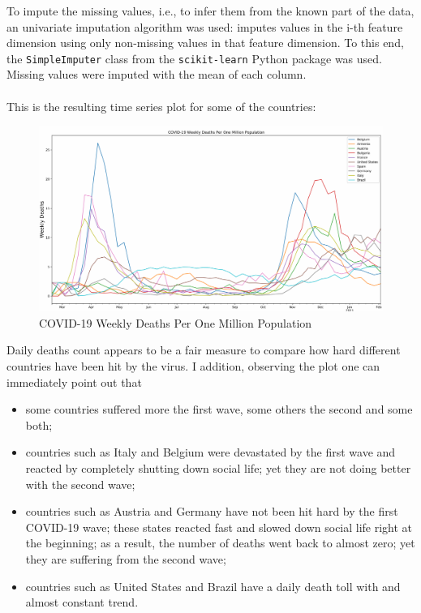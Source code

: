 \documentclass[11pt,a4paper]{article}
\begin{document}
To impute the missing values, i.e., to infer them from the known part of the
data, an univariate imputation algorithm was used: imputes values in the
i-th feature dimension using only non-missing values in that feature dimension.
To this end, the \texttt{SimpleImputer} class from the \texttt{scikit-learn}
Python package was used. Missing values were imputed with the mean of each
column.\\
\\
This is the resulting time series plot for some of the countries:
\begin{figure}[H]
    \begin{center}
        \hspace*{-1.7cm}
        \includegraphics[scale=0.46]{img/weekly-deaths.pdf}
    \end{center}
    \caption{COVID-19 Weekly Deaths Per One Million Population}
\end{figure}
\noindent Daily deaths count appears to be a fair measure to compare how hard
different countries have been hit by the virus. I addition, observing the plot
one can immediately point out that
\begin{itemize}
    \item some countries suffered more the first wave, some others the second
    and some both;
    \item countries such as {\color{ts_italy}Italy} and
    {\color{ts_belgium}Belgium} were devastated by the first wave and reacted
    by completely shutting down social life; yet they are not doing better with
    the second wave;
    \item countries such as {\color{ts_austria}Austria} and
    {\color{ts_germany}Germany} have not been hit hard by the first COVID-19
    wave; these states reacted fast and slowed down social life right at the
    beginning; as a result, the number of deaths went back to almost zero; yet
    they are suffering from the second wave;
    \item countries such as {\color{ts_unitedstates}United States} and
    {\color{ts_brazil}Brazil} have a daily death toll with and almost constant
    trend.
\end{itemize}
\end{document}
